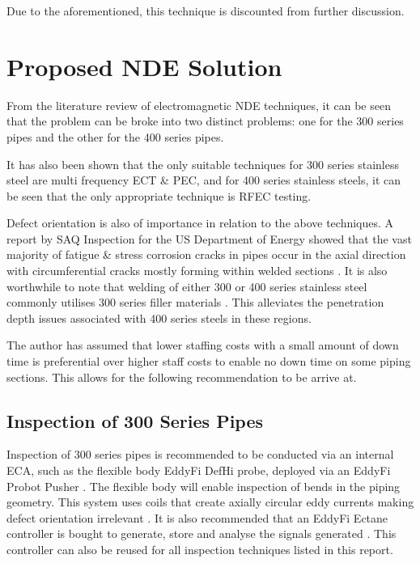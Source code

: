 \documentclass[a4paper,twoside,11pt]{article}
\begin{document}
Due to the aforementioned, this technique is discounted from further discussion.


\section{Proposed NDE Solution}

From the literature review of electromagnetic NDE techniques, it can be seen that the problem can be broke into two distinct problems: one for the 300 series pipes and the other for the 400 series pipes.   

It has also been shown that the only suitable techniques for 300 series stainless steel are multi frequency ECT \& PEC, and for 400 series stainless steels, it can be seen that the only appropriate technique is RFEC testing.

Defect orientation is also of importance in relation to the above techniques.
A report by SAQ Inspection for the US Department of Energy showed that the vast majority of fatigue \& stress corrosion cracks in pipes occur in the axial direction with circumferential cracks mostly forming within welded sections \cite{waleCRACKCHARACTERISATIONSERVICE}.
It is also worthwhile to note that welding of either 300 or 400 series stainless steel commonly utilises 300 series filler materials \cite{theweldinginstituteWeldingFerriticMartensitic2019}. 
This alleviates the penetration depth issues associated with 400 series steels in these regions.

The author has assumed that lower staffing costs with a small amount of down time is preferential over higher staff costs to enable no down time on some piping sections. 
This allows for the following recommendation to be arrive at.

\subsection{Inspection of 300 Series Pipes} 

Inspection of 300 series pipes is recommended to be conducted via an internal ECA, such as the flexible body EddyFi DefHi \cite{eddyfiECADefHiProbe2019} probe, deployed via an EddyFi Probot Pusher \cite{eddyfiProbotHighPerformanceProbe}.
The flexible body will enable inspection of bends in the piping geometry.
This system uses coils that create axially circular eddy currents making defect orientation irrelevant \cite{eddyfiECATechnologyDefHi2019}.
It is also recommended that an EddyFi Ectane controller is bought to generate, store and analyse the signals generated \cite{eddyfiEctaneMultitechnologyTubing2019}. This controller can also be reused for all inspection techniques listed in this report.
\end{document}
